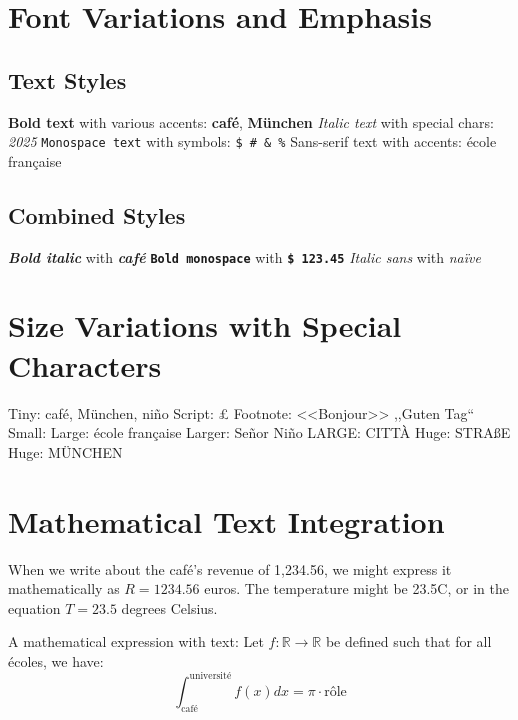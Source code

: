 \documentclass[12pt]{article}
\begin{document}
\section{Font Variations and Emphasis}

\subsection{Text Styles}
\textbf{Bold text} with various accents: \textbf{caf\'e}, \textbf{M\"unchen}
\textit{Italic text} with special chars: \textit{\textcopyright{} 2025}
\texttt{Monospace text} with symbols: \texttt{\$ \# \& \%}
\textsf{Sans-serif text} with accents: \textsf{\'ecole fran\c{c}aise}

\subsection{Combined Styles}
\textbf{\textit{Bold italic}} with \textbf{\textit{caf\'e}}
\texttt{\textbf{Bold monospace}} with \texttt{\textbf{\$ 123.45}}
\textsf{\textit{Italic sans}} with \textsf{\textit{na\"ive}}

\section{Size Variations with Special Characters}

{\tiny Tiny: caf\'e, M\"unchen, ni\~no}
{\scriptsize Script: \textcopyright{} \pounds{} \texteuro{}}
{\footnotesize Footnote: <<Bonjour>> ,,Guten Tag``}
{\small Small: \textonehalf{} \textonequarter{} \textthreequarters{}}
{\large Large: \'ecole fran\c{c}aise}
{\Large Larger: Se\~nor Ni\~no}
{\LARGE LARGE: CITT\`A}
{\huge Huge: STRA\ss{}E}
{\Huge Huge: M\"UNCHEN}

\section{Mathematical Text Integration}

When we write about the caf\'e's revenue of \texteuro{}1,234.56, we might express it mathematically as $R = 1234.56$ euros. The temperature might be 23.5\textdegree{}C, or in the equation $T = 23.5$ degrees Celsius.

A mathematical expression with text: Let $f: \mathbb{R} \to \mathbb{R}$ be defined such that for all \'ecoles, we have:
\begin{equation}
\int_{\text{caf\'e}}^{\text{universit\'e}} f(x) dx = \pi \cdot \text{r\^ole}
\end{equation}
\end{document}
